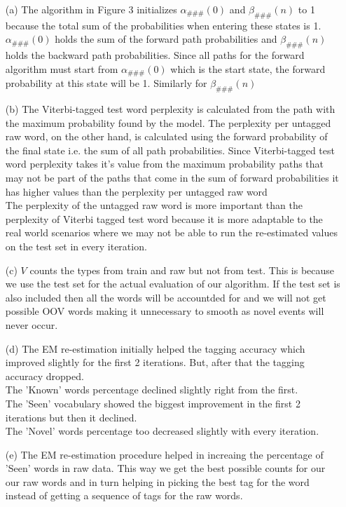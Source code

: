 \documentclass{article}
\begin{document}
\begin{enumerate}
\begin{enumerate}
    \item[(a)] The algorithm in Figure 3 initializes $\alpha_{\#\#\#}(0)$ and $\beta_{\#\#\#}(n)$ to 1 because the total sum of the probabilities when entering these states is 1. $\alpha_{\#\#\#}(0)$ holds the sum of the forward path probabilities and  $\beta_{\#\#\#}(n)$ holds the backward path probabilities. Since all paths for the forward algorithm must start from  $\alpha_{\#\#\#}(0)$ which is the start state, the forward probability at this state will be 1. Similarly for  $\beta_{\#\#\#}(n)$
    \item[(b)]
    The Viterbi-tagged test word perplexity is calculated from the path with the maximum probability found by the model. The perplexity per untagged raw word, on the other hand, is calculated using the forward probability of the final state i.e. the sum of all path probabilities. Since Viterbi-tagged test word perplexity takes it's value from the maximum probability paths that may not be part of the paths that come in the sum of forward probabilities it has higher values than the perplexity per untagged raw word
    \\The perplexity of the untagged raw word is more important than the perplexity of Viterbi tagged test word because it is more adaptable to the real world scenarios where we may not be able to run the re-estimated values on the test set in every iteration.
    \item[(c)]$V$ counts the types from train and raw but not from test. This is because we use the test set for the actual evaluation of our algorithm. If the test set is also included then all the words will be accountded for and we will not get possible OOV words making it unnecessary to smooth as novel events will never occur.
    \item[(d)]The EM re-estimation initially helped the tagging accuracy which improved slightly for the first 2 iterations. But, after that the tagging accuracy dropped. \\The 'Known' words percentage declined slightly right from the first.
    \\The 'Seen' vocabulary showed the biggest improvement in the first 2 iterations but then it declined. 
    \\The 'Novel' words percentage too decreased slightly with every iteration.
    \item[(e)] The EM re-estimation procedure helped in increaing the percentage of 'Seen' words in raw data. This way we get the best possible counts for our our raw words and in turn helping in picking the best tag for the word instead of getting a sequence of tags for the raw words. 

\end{enumerate}
\end{enumerate}
\end{document}
